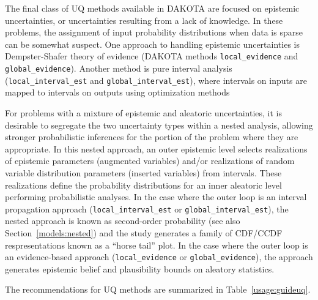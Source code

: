 The final class of UQ methods available in DAKOTA are focused on
epistemic uncertainties, or uncertainties resulting from a lack of
knowledge.  In these problems, the assignment of input probability
distributions when data is sparse can be somewhat suspect.  One
approach to handling epistemic uncertainties is Dempster-Shafer theory
of evidence (DAKOTA methods \texttt{local\_evidence} and 
\texttt{global\_evidence}). Another method is pure interval 
analysis (\texttt{local\_interval\_est} and 
\texttt{global\_interval\_est}), where intervals on inputs are 
mapped to intervals on outputs using optimization methods 

For problems with a mixture of epistemic and aleatoric uncertainties, 
it is desirable to segregate the two uncertainty types within a nested 
analysis, allowing stronger probabilistic inferences for the portion
of the problem where they are appropriate.  In this nested approach, an outer 
epistemic level selects realizations of epistemic parameters (augmented
variables) and/or realizations of random variable distribution
parameters (inserted variables) from intervals.  These realizations
define the probability distributions for an inner aleatoric level
performing probabilistic analyses.  In the case where the outer loop
is an interval propagation approach (\texttt{local\_interval\_est} or 
\texttt{global\_interval\_est}), the nested approach is
known as second-order probability (see also Section~\ref{models:nested})
and the study generates a family of CDF/CCDF respresentations known as a 
``horse tail'' plot.  In the case where the outer loop is an 
evidence-based approach (\texttt{local\_evidence} or 
\texttt{global\_evidence}), the approach generates epistemic belief 
and plausibility bounds on aleatory statistics.

The recommendations for UQ methods are summarized in Table~\ref{usage:guideuq}.

